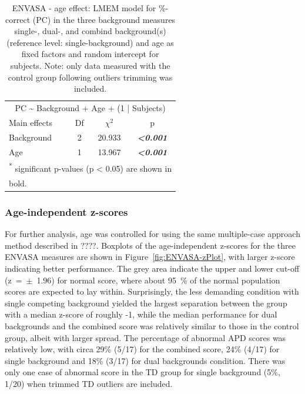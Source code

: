 \documentclass[a4paper, twoside]{templates/ociamthesis}
\begin{document}
\begin{table}

\caption{\label{tab:ENVASA-AgeLMEMTab}ENVASA - age effect: LMEM model for \%-correct (PC) in the three background measures single-, dual-, and combind background(s) (reference level: single-background) and age as fixed factors and random intercept for subjects. Note: only data measured with the control group following outliers trimming was included.}
\centering
\begin{tabular}[t]{lcc>{}c}
\toprule
\multicolumn{4}{c}{PC \textasciitilde{} Background + Age + (1 | Subjects)} \\
\cmidrule(l{3pt}r{3pt}){1-4}
Main effects & Df & $\chi^{2}$ & p\\
\midrule
Background & 2 & 20.933 & \em{\textbf{<0.001}}\\
Age & 1 & 13.967 & \em{\textbf{<0.001}}\\
\bottomrule
\multicolumn{4}{l}{\textsuperscript{*} significant p-values (p < 0.05) are shown in}\\
\multicolumn{4}{l}{bold.}\\
\end{tabular}
\end{table}

\hypertarget{age-independent-z-scores-2}{%
\subsubsection*{Age-independent z-scores}\label{age-independent-z-scores-2}}

For further analysis, age was controlled for using the same multiple-case approach method described in ????. Boxplots of the age-independent z-scores for the three ENVASA measures are shown in Figure~\ref{fig:ENVASA-zPlot}, with larger z-score indicating better performance. The grey area indicate the upper and lower cut-off (z~=~\(\pm\)~1.96) for normal score, where about 95~\% of the normal population scores are expected to lay within. Surprisingly, the less demanding condition with single competing background yielded the largest separation between the group with a median z-score of roughly -1, while the median performance for dual backgrounds and the combined score was relatively similar to those in the control group, albeit with larger spread. The percentage of abnormal APD scores was relatively low, with circa 29\% (5/17) for the combined score, 24\% (4/17) for single background and 18\% (3/17) for dual backgrounds condition. There was only one case of abnormal score in the TD group for single background (5\%, 1/20) when trimmed TD outliers are included.
\end{document}
